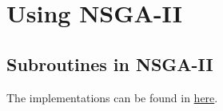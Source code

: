 \section{Using NSGA-II}

\subsection{Subroutines in NSGA-II}

The implementations can be found in \href{https://github.com/nngerncham/ma395_heuristic/blob/main/homework/hw5/code/code/nsga2.py}{here}.
